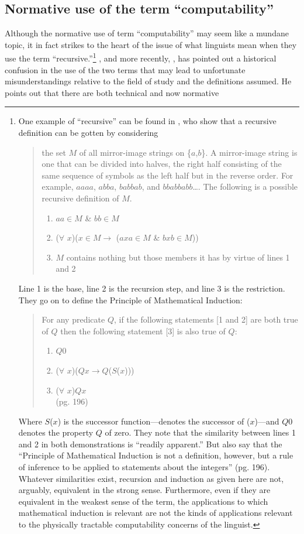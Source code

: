 \documentclass[11pt,twoside]{article}
\theoremstyle{plain}
\numberwithin{equation}{section}
\theoremstyle{definition}
\newtheorem{phrase string}{Phrase String}
\begin{document}
\subsection{Normative use of the term ``computability''}\label{normcomp}
Although the normative use of term ``computability'' may seem like a mundane topic, it in fact strikes to the heart of the issue of what linguists mean when they use the term ``recursive.''\footnote{One example of ``recursive'' can be found in \cite[181-82]{pmw:1990}, who show that a recursive definition can be gotten by considering \begin{quotation} the set $M$ of all mirror-image strings on \{$a$,$b$\}. A mirror-image string is one that can be divided into halves, the right half consisting of the same sequence of symbols as the left half but in the reverse order. For example, $aaaa$, $abba$, $babbab$, and $bbabbabb$\ldots. The following is a possible recursive definition of $M$. \begin{enumerate} \item $aa \in M$ \& $bb \in M$ \item ($\forall$ $x$)($x \in M \rightarrow$ ($axa \in M$ \& $bxb \in M$)) \item $M$ contains nothing but those members it has by virtue of lines 1 and 2\\\end{enumerate}\end{quotation} Line 1 is the base, line 2 is the recursion step, and line 3 is the restriction. They go on to define the Principle of Mathematical Induction: \begin{quote} For any predicate $Q$, if the following statements [1 and 2] are both true of $Q$ then the following statement [3] is also true of $Q$: \begin{enumerate} \item $Q$0 \item ($\forall$ $x$)($Qx \rightarrow Q$($S$($x$))) \item ($\forall$ $x$)$Qx$\\ (pg. 196)\end{enumerate}\end{quote} Where $S$($x$) is the successor function---denotes the successor of ($x$)---and $Q$0 denotes the property $Q$ of zero. They note that the similarity between lines 1 and 2 in both demonstrations is ``readily apparent.'' But also say that the ``Principle of Mathematical Induction is not a definition, however, but a rule of inference to be applied to statements about the integers'' (pg. 196). Whatever similarities exist, recursion and induction as given here are not, arguably, equivalent in the strong sense. Furthermore, even if they are equivalent in the weakest sense of the term, the applications to which mathematical induction is relevant are not the kinds of applications relevant to the physically tractable computability concerns of the linguist.} \cite{soare:1996}, and more recently, \cite{soare:2007,soare:2008}, has pointed out a historical confusion in the use of the two terms that may lead to unfortunate misunderstandings relative to the field of study and the definitions assumed. He points out that there are both technical and now normative 
\end{document}
